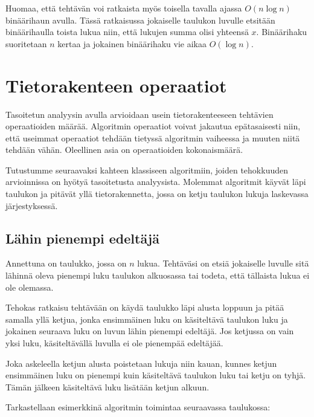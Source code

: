 Huomaa, että tehtävän voi ratkaista myös 
toisella tavalla ajassa
$O(n \log n)$ binäärihaun avulla.
Tässä ratkaisussa jokaiselle taulukon luvulle
etsitään binäärihaulla toista lukua niin,
että lukujen summa olisi yhteensä $x$.
Binäärihaku suoritetaan $n$ kertaa ja
jokainen binäärihaku vie aikaa $O(\log n)$.

\section{Tietorakenteen operaatiot}

Tasoitetun analyysin avulla arvioidaan usein
tietorakenteeseen tehtävien operaatioiden määrää.
Algoritmin operaatiot voivat jakautua epätasaisesti
niin, että useimmat operaatiot tehdään tietyssä
algoritmin vaiheessa ja muuten niitä tehdään vähän.
Oleellinen asia on operaatioiden kokonaismäärä.

Tutustumme seuraavaksi kahteen klassiseen algoritmiin,
joiden tehokkuuden arvioinnissa on hyötyä
tasoitetusta analyysista.
Molemmat algoritmit käyvät läpi taulukon ja
pitävät yllä tietorakennetta, jossa on ketju
taulukon lukuja laskevassa järjestyksessä.

\subsection{Lähin pienempi edeltäjä}


\begin{task}
Annettuna on taulukko, jossa on $n$ lukua.
Tehtäväsi on etsiä jokaiselle luvulle
sitä lähinnä oleva pienempi luku
taulukon alkuosassa
tai todeta, että tällaista lukua ei ole olemassa.
\end{task}

Tehokas ratkaisu tehtävään on käydä
taulukko läpi alusta loppuun ja pitää samalla yllä ketjua,
jonka ensimmäinen luku on käsiteltävä taulukon luku
ja jokainen seuraava luku on luvun lähin
pienempi edeltäjä.
Jos ketjussa on vain yksi luku,
käsiteltävällä luvulla ei ole pienempää edeltäjää.

Joka askeleella ketjun alusta poistetaan lukuja
niin kauan, kunnes ketjun ensimmäinen luku on 
pienempi kuin käsiteltävä taulukon luku tai ketju on tyhjä.
Tämän jälkeen käsiteltävä luku lisätään ketjun alkuun.

Tarkastellaan esimerkkinä algoritmin toimintaa
seuraavassa taulukossa:

